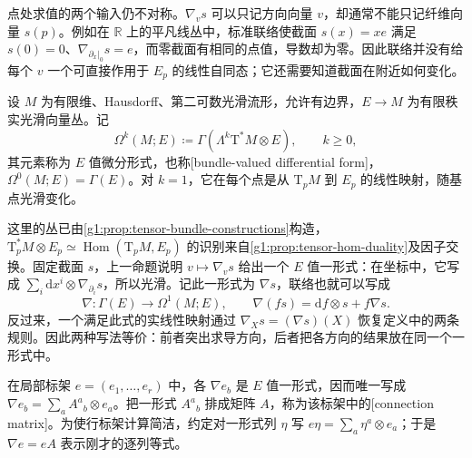 点处求值的两个输入仍不对称。\(\nabla_v s\) 可以只记方向向量 \(v\)，却通常不能只记纤维向量 \(s(p)\)。例如在 \(\mathbb R\) 上的平凡线丛中，标准联络使截面 \(s(x)=xe\) 满足 \(s(0)=0\)、\(\nabla_{\partial_x|_0}s=e\)，而零截面有相同的点值，导数却为零。因此联络并没有给每个 \(v\) 一个可直接作用于 \(E_p\) 的线性自同态；它还需要知道截面在附近如何变化。

\begin{definition}\label{g1:def:bundle-valued-form}
	设 \(M\) 为有限维、Hausdorff、第二可数光滑流形，允许有边界，\(E\to M\) 为有限秩实光滑向量丛。记
	\[
		\Omega^k(M;E)\coloneqq\Gamma(\Lambda^k\mathrm{T}^*M\otimes E),\qquad k\geq0,
	\]
	其元素称为 \(E\) 值微分形式，也称[bundle-valued differential form]，\(\Omega^0(M;E)=\Gamma(E)\)。对 \(k=1\)，它在每个点是从 \(\mathrm{T}_pM\) 到 \(E_p\) 的线性映射，随基点光滑变化。
\end{definition}

这里的丛已由\cref{g1:prop:tensor-bundle-constructions}构造，\(\mathrm{T}_p^*M\otimes E_p\simeq\operatorname{Hom}(\mathrm{T}_pM,E_p)\) 的识别来自\cref{g1:prop:tensor-hom-duality}及因子交换。固定截面 \(s\)，上一命题说明 \(v\mapsto\nabla_v s\) 给出一个 \(E\) 值一形式：在坐标中，它写成 \(\sum_i\mathrm{d}x^i\otimes\nabla_{\partial_i}s\)，所以光滑。记此一形式为 \(\nabla s\)，联络也就可以写成
\[
	\nabla:\Gamma(E)\longrightarrow\Omega^1(M;E),\qquad
	\nabla(fs)=\mathrm{d}f\otimes s+f\nabla s.
\]
反过来，一个满足此式的实线性映射通过 \(\nabla_Xs=(\nabla s)(X)\) 恢复定义中的两条规则。因此两种写法等价：前者突出求导方向，后者把各方向的结果放在同一个一形式中。

\ProseParagraphBreak

在局部标架 \(e=(e_1,\ldots,e_r)\) 中，各 \(\nabla e_b\) 是 \(E\) 值一形式，因而唯一写成 \(\nabla e_b=\sum_a A^a{}_b\otimes e_a\)。把一形式 \(A^a{}_b\) 排成矩阵 \(A\)，称为该标架中的[connection matrix]。为使行标架计算简洁，约定对一形式列 \(\eta\) 写 \(e\eta=\sum_a\eta^a\otimes e_a\)；于是 \(\nabla e=eA\) 表示刚才的逐列等式。

